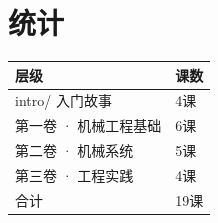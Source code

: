 \documentclass[a4paper,11pt]{ctexart}
\begin{document}
\section*{统计}

\begin{tabular}{ll}
\toprule
层级 & 课数 \\
\midrule
intro/ 入门故事 & 4课 \\
第一卷 · 机械工程基础 & 6课 \\
第二卷 · 机械系统 & 5课 \\
第三卷 · 工程实践 & 4课 \\
\midrule
合计 & 19课 \\
\bottomrule
\end{tabular}
\end{document}
